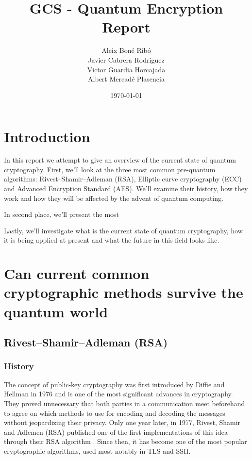 
\usepackage{dsfont}





\title{
    GCS - Quantum Encryption Report
}
\author{
Aleix Boné Ribó\\
Javier Cabrera Rodríguez\\
Victor Guardia Horcajada\\
Albert Mercadé Plasencia
}
\date{
    \today
}





\tableofcontents

\setlength{\parskip}{1em}

\pagebreak
\section{Introduction}%
\label{sec:introduction}

In this report we attempt to give an overview of the current state of quantum
cryptography. First, we’ll look at the three most common pre-quantum algorithms:
Rivest–Shamir–Adleman (RSA), Elliptic curve cryptography (ECC) and Advanced
Encryption Standard (AES). We’ll examine their history, how they work and how
they will be affected by the advent of quantum computing.

In second place, we’ll present the most %

Lastly, we’ll investigate what is the current state of quantum cryptography, how
it is being applied at present and what the future in this field looks like.


\pagebreak
\section{Can current common cryptographic methods survive the quantum world}

\subsection{Rivest–Shamir–Adleman (RSA)}

\subsubsection{History}

The concept of public-key cryptography was first introduced by Diffie and
Hellman in 1976 and is one of the most significant advances in cryptography.
They proved unnecessary that both parties in a communication meet beforehand to
agree on which methods to use for encoding and decoding the messages without
jeopardizing their privacy. Only one year later, in 1977, Rivest, Shamir and
Adlemen (RSA) published one of the first implementations of this idea through
their RSA algorithm \cite{rivest_method_1978}. Since then, it has become one of the most popular
cryptographic algorithms, used most notably in TLS and SSH.

